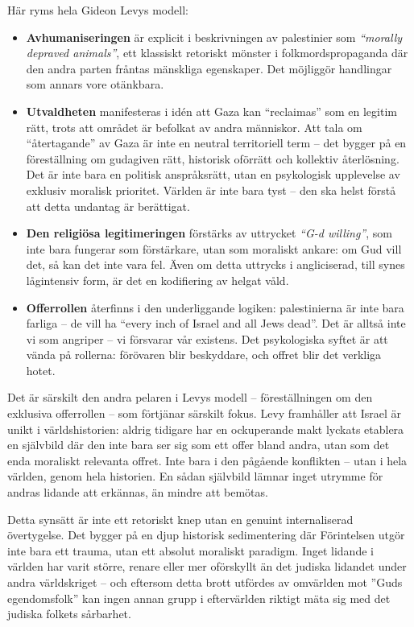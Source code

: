 Här ryms hela Gideon Levys modell:

\begin{itemize}
    \item \textbf{Avhumaniseringen} är explicit i beskrivningen av palestinier som \textit{“morally depraved animals”}, ett klassiskt retoriskt mönster i folkmordspropaganda där den andra parten fråntas mänskliga egenskaper. Det möjliggör handlingar som annars vore otänkbara.
    
    \item \textbf{Utvaldheten} manifesteras i idén att Gaza kan “reclaimas” som en legitim rätt, trots att området är befolkat av andra människor. Att tala om “återtagande” av Gaza är inte en neutral territoriell term – det bygger på en föreställning om gudagiven rätt, historisk oförrätt och kollektiv återlösning. Det är inte bara en politisk anspråksrätt, utan en psykologisk upplevelse av exklusiv moralisk prioritet. Världen är inte bara tyst – den ska helst förstå att detta undantag är berättigat.

    \item \textbf{Den religiösa legitimeringen} förstärks av uttrycket \textit{“G-d willing”}, som inte bara fungerar som förstärkare, utan som moraliskt ankare: om Gud vill det, så kan det inte vara fel. Även om detta uttrycks i angliciserad, till synes lågintensiv form, är det en kodifiering av helgat våld.

    \item \textbf{Offerrollen} återfinns i den underliggande logiken: palestinierna är inte bara farliga – de vill ha “every inch of Israel and all Jews dead”. Det är alltså inte vi som angriper – vi försvarar vår existens. Det psykologiska syftet är att vända på rollerna: förövaren blir beskyddare, och offret blir det verkliga hotet.
\end{itemize}

Det är särskilt den andra pelaren i Levys modell – föreställningen om den exklusiva offerrollen – som förtjänar särskilt fokus. Levy framhåller att Israel är unikt i världshistorien: aldrig tidigare har en ockuperande makt lyckats etablera en självbild där den inte bara ser sig som ett offer bland andra, utan som det enda moraliskt relevanta offret. Inte bara i den pågående konflikten – utan i hela världen, genom hela historien. En sådan självbild lämnar inget utrymme för andras lidande att erkännas, än mindre att bemötas.


Detta synsätt är inte ett retoriskt knep utan en genuint internaliserad övertygelse. Det bygger på en djup historisk sedimentering där Förintelsen utgör inte bara ett trauma, utan ett absolut moraliskt paradigm. Inget lidande i världen har varit större, renare eller mer oförskyllt än det judiska lidandet under andra världskriget – och eftersom detta brott utfördes av omvärlden mot ”Guds egendomsfolk” kan ingen annan grupp i eftervärlden riktigt mäta sig med det judiska folkets sårbarhet. 

